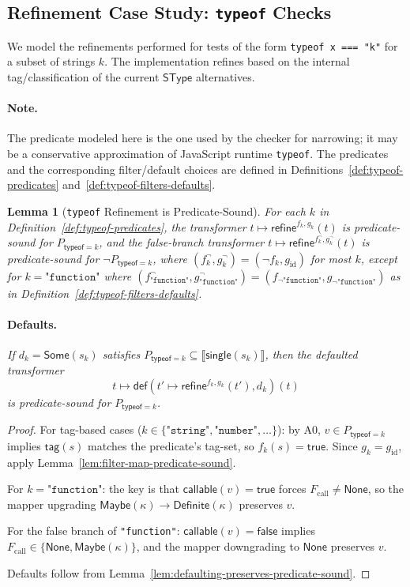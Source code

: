 \documentclass[11pt]{article}
\newtheorem{lemma}[theorem]{Lemma}
\newcommand{\sem}[1]{\llbracket #1 \rrbracket}
\newcommand{\refineop}{\mathsf{refine}}
\newcommand{\SType}{\mathsf{SType}}
\newcommand{\tagfn}{\mathsf{tag}}
\begin{document}
\subsection{Refinement Case Study: \texttt{typeof} Checks}

We model the refinements performed for tests of the form \texttt{typeof x === "k"} for a subset of strings $k$.
The implementation refines based on the internal tag/classification of the current $\SType$ alternatives.
\paragraph{Note.}
The predicate modeled here is the one used by the checker for narrowing; it may be a conservative approximation of JavaScript runtime \texttt{typeof}.
The predicates and the corresponding filter/default choices are defined in
Definitions~\ref{def:typeof-predicates} and~\ref{def:typeof-filters-defaults}.

\begin{lemma}[\texttt{typeof} Refinement is Predicate-Sound]
\label{lem:typeof-refine-predicate-sound}
For each $k$ in Definition~\ref{def:typeof-predicates}, the transformer $t \mapsto \refineop^{f_k,g_k}(t)$ is predicate-sound for $P_{\mathsf{typeof}=k}$,
and the false-branch transformer $t \mapsto \refineop^{f^{\neg}_k,g^{\neg}_k}(t)$ is predicate-sound for $\neg P_{\mathsf{typeof}=k}$,
where $(f^{\neg}_k, g^{\neg}_k) = (\neg f_k, g_{\mathrm{id}})$ for most $k$, except for $k=\texttt{"function"}$ where $(f^{\neg}_{\texttt{"function"}}, g^{\neg}_{\texttt{"function"}}) = (f_{\neg\texttt{"function"}}, g_{\neg\texttt{"function"}})$ as in Definition~\ref{def:typeof-filters-defaults}.
\paragraph{Defaults.}
If $d_k=\mathsf{Some}(s_k)$ satisfies $P_{\mathsf{typeof}=k} \subseteq \sem{\mathsf{single}(s_k)}$, then the defaulted transformer
\[
t \mapsto \mathsf{def}(t' \mapsto \refineop^{f_k,g_k}(t'), d_k)(t)
\]
is predicate-sound for $P_{\mathsf{typeof}=k}$.
\end{lemma}

\begin{proof}
For tag-based cases ($k \in \{\texttt{"string"}, \texttt{"number"}, \ldots\}$): by A0, $v \in P_{\mathsf{typeof}=k}$ implies $\tagfn(s)$ matches the predicate's tag-set, so $f_k(s)=\mathsf{true}$.
Since $g_k = g_{\mathrm{id}}$, apply Lemma~\ref{lem:filter-map-predicate-sound}.

For $k=\texttt{"function"}$: the key is that $\mathsf{callable}(v)=\mathsf{true}$ forces $F_{\mathrm{call}} \neq \mathsf{None}$, so the mapper upgrading $\mathsf{Maybe}(\kappa) \to \mathsf{Definite}(\kappa)$ preserves $v$.

For the false branch of \texttt{"function"}: $\mathsf{callable}(v)=\mathsf{false}$ implies $F_{\mathrm{call}} \in \{\mathsf{None}, \mathsf{Maybe}(\kappa)\}$, and the mapper downgrading to $\mathsf{None}$ preserves $v$.

Defaults follow from Lemma~\ref{lem:defaulting-preserves-predicate-sound}.
\end{proof}
\end{document}
